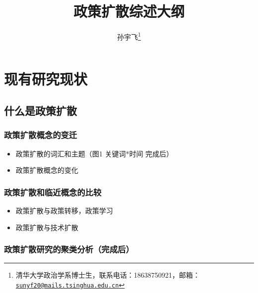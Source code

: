 \documentclass[
  12pt,
]{ctexart}
\title{政策扩散综述大纲}
\author{孙宇飞\footnote{清华大学政治学系博士生，联系电话：18638750921，邮箱：\href{mailto:sunyf20@mails.tsinghua.edu.cn}{\nolinkurl{sunyf20@mails.tsinghua.edu.cn}}}}
\date{}
\begin{document}
\maketitle

\hypertarget{ux73b0ux6709ux7814ux7a76ux73b0ux72b6}{%
\section{现有研究现状}\label{ux73b0ux6709ux7814ux7a76ux73b0ux72b6}}

\hypertarget{ux4ec0ux4e48ux662fux653fux7b56ux6269ux6563}{%
\subsection{什么是政策扩散}\label{ux4ec0ux4e48ux662fux653fux7b56ux6269ux6563}}

\hypertarget{ux653fux7b56ux6269ux6563ux6982ux5ff5ux7684ux53d8ux8fc1}{%
\subsubsection{政策扩散概念的变迁}\label{ux653fux7b56ux6269ux6563ux6982ux5ff5ux7684ux53d8ux8fc1}}

\begin{itemize}
\item
  政策扩散的词汇和主题（图1 关键词*时间 完成后）
\item
  政策扩散概念的变化
\end{itemize}

\hypertarget{ux653fux7b56ux6269ux6563ux548cux4e34ux8fd1ux6982ux5ff5ux7684ux6bd4ux8f83}{%
\subsubsection{政策扩散和临近概念的比较}\label{ux653fux7b56ux6269ux6563ux548cux4e34ux8fd1ux6982ux5ff5ux7684ux6bd4ux8f83}}

\begin{itemize}
\item
  政策扩散与政策转移，政策学习
\item
  政策扩散与技术扩散
\end{itemize}

\hypertarget{ux653fux7b56ux6269ux6563ux7814ux7a76ux7684ux805aux7c7bux5206ux6790ux5b8cux6210ux540e}{%
\subsubsection{政策扩散研究的聚类分析（完成后）}\label{ux653fux7b56ux6269ux6563ux7814ux7a76ux7684ux805aux7c7bux5206ux6790ux5b8cux6210ux540e}}
\end{document}
